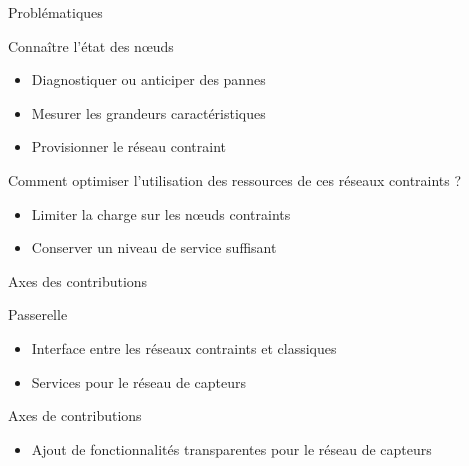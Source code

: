 \begin{frame}{Problématiques}
  \begin{block}{Connaître l'état des nœuds}
    \begin{itemize}
      \item Diagnostiquer ou anticiper des pannes
      \item Mesurer les grandeurs caractéristiques
      \item Provisionner le réseau contraint
    \end{itemize}
  \end{block}

  \begin{block}{Comment optimiser l'utilisation des ressources de ces réseaux contraints ?}
    \begin{itemize}
      \item Limiter la charge sur les nœuds contraints
      \item Conserver un niveau de service suffisant
    \end{itemize}
  \end{block}

\end{frame}

\begin{frame}{Axes des contributions}
  \begin{block}{Passerelle}
    \begin{itemize}
      \item Interface entre les réseaux contraints et classiques
      \item Services pour le réseau de capteurs
    \end{itemize}
  \end{block}

  \begin{alertblock}{Axes de contributions}
    \begin{itemize}
      \item Ajout de fonctionnalités transparentes pour le réseau de capteurs
    \end{itemize}
  \end{alertblock}

  

\end{frame}